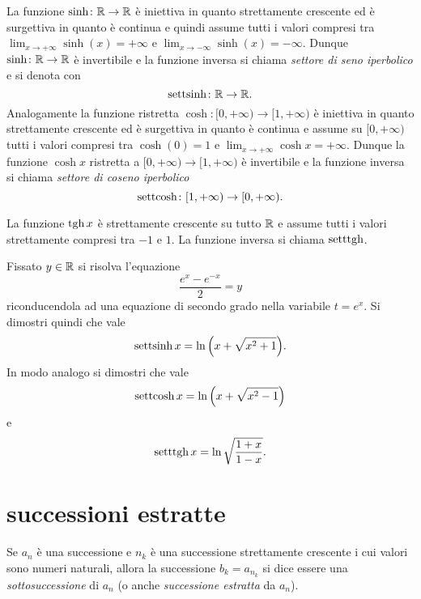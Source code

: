 La funzione $\sinh\colon {\mathbb R}\to{\mathbb R}$ è iniettiva in quanto strettamente crescente ed
è surgettiva in quanto è continua e quindi assume tutti i valori compresi tra
$\lim_{x\to+\infty} \sinh(x) = +\infty$ e $\lim_{x\to -\infty} \sinh(x) = -\infty$. 
Dunque $\sinh\colon {\mathbb R} \to {\mathbb R}$
è invertibile e la funzione inversa si chiama \emph{settore di seno iperbolico}
e si denota con
\mymargin{$\settsinh$}%
\index{$\settsinh$}
\[
    \operatorname{settsinh} \colon {\mathbb R} \to {\mathbb R}.
\]
Analogamente la funzione ristretta $\cosh\colon [0,+\infty)\to [1,+\infty)$ è
iniettiva in quanto strettamente crescente ed è surgettiva in quanto
è continua e assume su $[0,+\infty)$ tutti i valori compresi tra $\cosh(0)=1$ e
$\lim_{x\to +\infty} \cosh x = +\infty$.
Dunque la funzione $\cosh x$ ristretta a $[0,+\infty)\to [1,+\infty)$
è invertibile e la funzione inversa si chiama \emph{settore di coseno iperbolico}
\mymargin{$\settcosh$}%
\index{$\settcosh$}
\[
    \operatorname{settcosh} \colon [1,+\infty)\to [0,+\infty).
\]

La funzione $\operatorname{tgh} x$ è strettamente crescente su tutto ${\mathbb R}$ e assume tutti i valori strettamente compresi tra $-1$ e $1$.
La funzione inversa si chiama $\operatorname{setttgh}$.

\begin{exercise}
Fissato $y\in {\mathbb R}$ si risolva l'equazione
\[
    \frac{e^x - e^{-x}}{2} = y
\]
riconducendola ad una equazione di secondo grado nella variabile $t=e^x$.
Si dimostri quindi che vale
\[
    \operatorname{settsinh} x = \ln{\left( x + \sqrt{x^2 + 1} \right)}.
\]
In modo analogo si dimostri che vale
\[
    \operatorname{settcosh} x = \ln{\left( x + \sqrt{x^2 - 1} \right)}
\]
e
\[
    \operatorname{setttgh} x = \ln \sqrt{\frac{1+x}{1-x}}.
\]
\end{exercise}

\section{successioni estratte}

\begin{definition}[sottosuccessione]
\mymark{*}
Se $a_n$ è una successione e $n_k$ è una successione strettamente crescente i cui valori sono numeri naturali, allora la successione
$b_k = a_{n_k}$ si dice essere una \emph{sottosuccessione}%
%
 di $a_n$
(o anche \emph{successione estratta} da $a_n$).
\end{definition}

